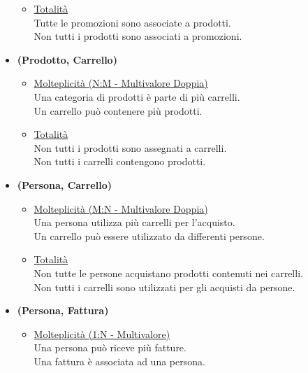\documentclass[12pt]{report}
\begin{document}
\begin{itemize}
\begin{itemize}
		\item \underline{Totalità} \\ [2mm]
			Tutte le promozioni sono associate a prodotti.\\
            Non tutti i prodotti sono associati a promozioni.\\
	\end{itemize}

\item \textbf{(Prodotto, Carrello)} 
	\begin{itemize}
		\item \underline{Molteplicità (N:M - Multivalore Doppia)} \\ [2mm]
			Una categoria di prodotti è parte di più carrelli.\\
            Un carrello può contenere più prodotti.\\

		\item \underline{Totalità} \\ [2mm]
			Non tutti i prodotti sono assegnati a carrelli.\\
            Non tutti i carrelli contengono prodotti.\\
	\end{itemize}	
	
\item \textbf{(Persona, Carrello)} 
	\begin{itemize}
		\item \underline{Molteplicità (M:N - Multivalore Doppia) } \\ [2mm]
			Una persona utilizza più carrelli per l'acquisto.\\
            Un carrello può essere utilizzato da differenti persone.\\ 

		\item \underline{Totalità} \\ [2mm]
        	Non tutte le persone acquistano prodotti contenuti nei carrelli.\\
            Non tutti i carrelli sono utilizzati per gli acquisti da persone.\\

	\end{itemize}
\item \textbf{(Persona, Fattura)} 
	\begin{itemize}
		\item \underline{Molteplicità (1:N - Multivalore) } \\ [2mm]
	    	Una persona può riceve più fatture.\\
            Una fattura è associata ad una persona.\\


\end{itemize}
\end{itemize}
\end{document}
